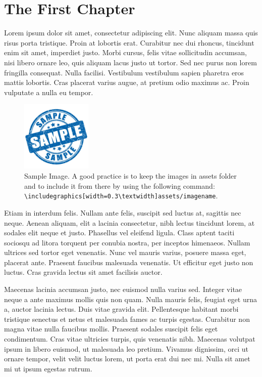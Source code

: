 
\newpage
\chapter{The First Chapter}


Lorem ipsum dolor sit amet, consectetur adipiscing elit. Nunc aliquam massa quis risus porta tristique. Proin at lobortis erat. Curabitur nec dui rhoncus, tincidunt enim sit amet, imperdiet justo. Morbi cursus, felis vitae sollicitudin accumsan, nisi libero ornare leo, quis aliquam lacus justo ut tortor. Sed nec purus non lorem fringilla consequat. Nulla facilisi. Vestibulum vestibulum sapien pharetra eros mattis lobortis. Cras placerat varius augue, at pretium odio maximus ac. Proin vulputate a nulla eu tempor.

\begin{figure}[h]
    \centering
    \includegraphics[width=0.3\textwidth]{assets/sample.jpg}
    \caption{Sample Image. A good practice is to keep the images in assets folder and to include it from there by using the following command: \texttt{\textbackslash includegraphics[width=0.3\textbackslash textwidth]{assets/imagename}}.}
\end{figure}

Etiam in interdum felis. Nullam ante felis, suscipit sed luctus at, sagittis nec neque. Aenean aliquam, elit a lacinia consectetur, nibh lectus tincidunt lorem, at sodales elit neque et justo. Phasellus vel eleifend ligula. Class aptent taciti sociosqu ad litora torquent per conubia nostra, per inceptos himenaeos. Nullam ultrices sed tortor eget venenatis. Nunc vel mauris varius, posuere massa eget, placerat ante. Praesent faucibus malesuada venenatis. Ut efficitur eget justo non luctus. Cras gravida lectus sit amet facilisis auctor.

Maecenas lacinia accumsan justo, nec euismod nulla varius sed. Integer vitae neque a ante maximus mollis quis non quam. Nulla mauris felis, feugiat eget urna a, auctor lacinia lectus. Duis vitae gravida elit. Pellentesque habitant morbi tristique senectus et netus et malesuada fames ac turpis egestas. Curabitur non magna vitae nulla faucibus mollis. Praesent sodales suscipit felis eget condimentum. Cras vitae ultricies turpis, quis venenatis nibh. Maecenas volutpat ipsum in libero euismod, ut malesuada leo pretium. Vivamus dignissim, orci ut ornare tempor, velit velit luctus lorem, ut porta erat dui nec mi. Nulla sit amet mi ut ipsum egestas rutrum.

